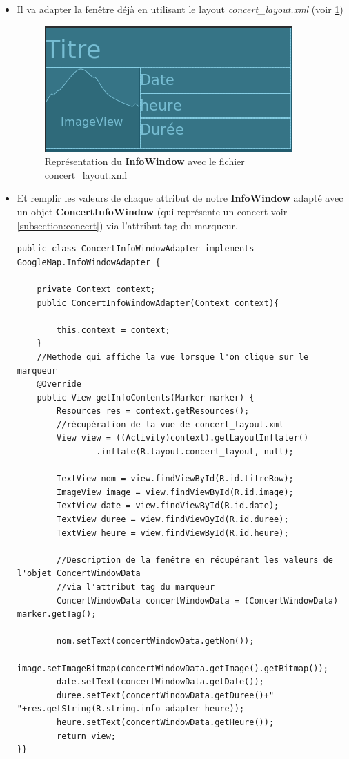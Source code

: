 \documentclass{article}
\begin{document}
\begin{itemize}
\item Il va adapter la fenêtre déjà en utilisant le layout \textit{concert\_layout.xml} (voir \ref{fig:concert_layout})
\begin{figure}[h!]
\centering
\includegraphics[scale=0.6]{./img/concert_layout.png}
\caption{Représentation du \textbf{InfoWindow} avec le fichier concert\_layout.xml \label{fig:concert_layout}}
\end{figure}
\item Et remplir les valeurs de chaque attribut de notre \textbf{InfoWindow} adapté avec un objet \textbf{ConcertInfoWindow} (qui représente un concert voir \ref{subsection:concert}) via l'attribut tag du marqueur. 
\begin{verbatim}
public class ConcertInfoWindowAdapter implements GoogleMap.InfoWindowAdapter {

    private Context context;
    public ConcertInfoWindowAdapter(Context context){

        this.context = context;
    }
    //Methode qui affiche la vue lorsque l'on clique sur le marqueur
    @Override
    public View getInfoContents(Marker marker) {
        Resources res = context.getResources();
        //récupération de la vue de concert_layout.xml
        View view = ((Activity)context).getLayoutInflater()
                .inflate(R.layout.concert_layout, null);

        TextView nom = view.findViewById(R.id.titreRow);
        ImageView image = view.findViewById(R.id.image);
        TextView date = view.findViewById(R.id.date);
        TextView duree = view.findViewById(R.id.duree);
        TextView heure = view.findViewById(R.id.heure);

        //Description de la fenêtre en récupérant les valeurs de l'objet ConcertWindowData 
        //via l'attribut tag du marqueur
        ConcertWindowData concertWindowData = (ConcertWindowData) marker.getTag();

        nom.setText(concertWindowData.getNom());
        image.setImageBitmap(concertWindowData.getImage().getBitmap());
        date.setText(concertWindowData.getDate());
        duree.setText(concertWindowData.getDuree()+" "+res.getString(R.string.info_adapter_heure));
        heure.setText(concertWindowData.getHeure());
        return view;
}}
\end{verbatim} 
\end{itemize}
\end{document}
